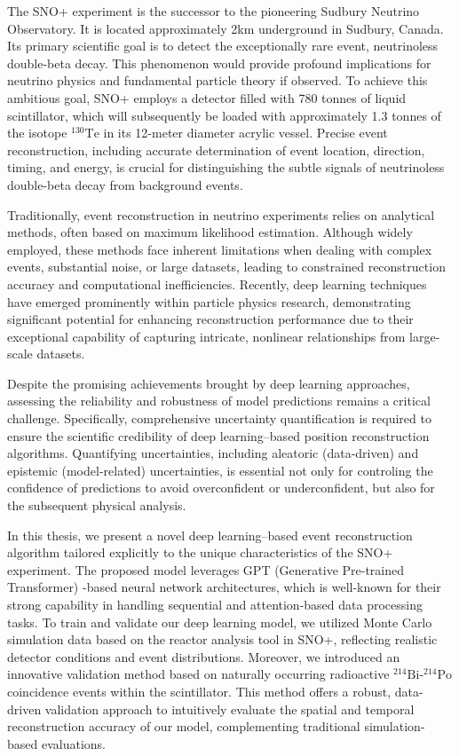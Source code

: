 \begin{enabstract}

The SNO+ experiment is the successor to the pioneering Sudbury 
Neutrino Observatory. It is located approximately 2km 
underground in Sudbury, Canada. Its primary scientific goal is 
to detect the exceptionally rare event, neutrinoless double-beta 
decay. This phenomenon would provide profound 
implications for neutrino physics and fundamental particle theory 
if observed. To achieve this ambitious goal, SNO+ employs a 
detector filled with 780 tonnes of liquid scintillator, which 
will subsequently be loaded with approximately 1.3 tonnes of 
the isotope $^{130}\mathrm{Te}$ in its 12-meter diameter acrylic 
vessel. Precise event reconstruction, including accurate 
determination of event location, direction, timing, and energy, 
is crucial for distinguishing the subtle signals of neutrinoless double-beta 
decay from background events.

Traditionally, event reconstruction in neutrino experiments 
relies on analytical methods, often based on maximum likelihood 
estimation. Although widely employed, these methods face 
inherent limitations when dealing with complex events, substantial 
noise, or large datasets, leading to constrained reconstruction 
accuracy and computational inefficiencies. Recently, 
deep learning techniques have emerged prominently 
within particle physics research, demonstrating significant 
potential for enhancing reconstruction performance due to 
their exceptional capability of capturing intricate, nonlinear 
relationships from large-scale datasets.

Despite the promising achievements brought by deep learning approaches, 
assessing the reliability and robustness of model predictions 
remains a critical challenge. Specifically, comprehensive 
uncertainty quantification is required to ensure the scientific 
credibility of deep learning–based position reconstruction algorithms. 
Quantifying uncertainties, including aleatoric (data-driven) and epistemic (model-related) uncertainties, 
is essential not only for controling the confidence of predictions to avoid overconfident or underconfident, 
but also for the subsequent physical analysis.

In this thesis, we present a novel deep learning–based event 
reconstruction algorithm tailored explicitly to the unique 
characteristics of the SNO+ experiment. The proposed model 
leverages GPT (Generative Pre-trained Transformer) -based neural network architectures, 
which is well-known for their strong capability in handling 
sequential and attention-based data processing tasks. To 
train and validate our deep learning model, we utilized Monte Carlo 
simulation data based on the reactor analysis tool in SNO+, 
reflecting realistic detector conditions and event distributions. 
Moreover, we introduced an innovative validation method based on 
naturally occurring radioactive 
$^{214}\mathrm{Bi}$-$^{214}\mathrm{Po}$ coincidence events within 
the scintillator. This method offers a robust, data-driven 
validation approach to intuitively evaluate the spatial and 
temporal reconstruction accuracy of our model, complementing 
traditional simulation-based evaluations.


\end{enabstract}
